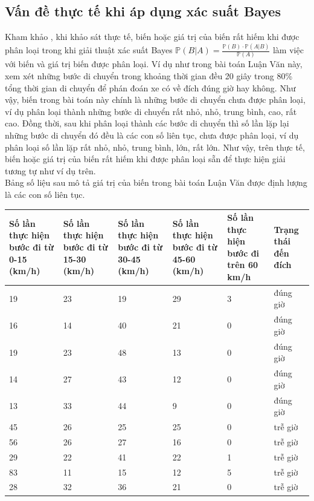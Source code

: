 \documentclass[a4paper, 13pt]{report}
\begin{document}
\subsection*{Vấn đề thực tế khi áp dụng xác suất Bayes}
Kham khảo \cite{2WAYSOFNB}, khi khảo sát thực tế, biến hoặc giá trị của biến rất hiếm khi được phân loại trong khi giải thuật xác suất Bayes $\mathbb{P}(B|A) = \frac{\mathbb{P}(B) \cdot \mathbb{P}(A|B)}{\mathbb{P}(A)}$ làm việc với biến và giá trị biến được phân loại. Ví dụ như trong bài toán Luận Văn này, xem xét những bước di chuyển trong khoảng thời gian đều 20 giây trong 80\% tổng thời gian di chuyển để phán đoán xe có về đích đúng giờ hay không. Như vậy, biến trong bài toán này chính là những bước di chuyển chưa được phân loại, ví dụ phân loại thành những bước di chuyển rất nhỏ, nhỏ, trung bình, cao, rất cao. Đồng thời, sau khi phân loại thành các bước di chuyển thì số lần lặp lại những bước di chuyển đó đều là các con số liên tục, chưa được phân loại, ví dụ phân loại số lần lặp rất nhỏ, nhỏ, trung bình, lớn, rất lớn. Như vậy, trên thực tế, biến hoặc giá trị của biến rất hiếm khi được phân loại sẵn để thực hiện giải tương tự như ví dụ trên.\\
Bảng số liệu sau mô tả giá trị của biến trong bài toán Luận Văn được định lượng là các con số liên tục.
\begin{flushleft}
\begin{tabular}{|p{2.6cm}|p{2.6cm}|p{2.6cm}|p{2.6cm}|p{2.6cm}|p{1.5cm}|}
\hline
Số lần thực hiện bước đi từ 0-15 (km/h)& Số lần thực hiện bước đi từ 15-30 (km/h) & Số lần thực hiện bước đi từ 30-45 (km/h) & Số lần thực hiện bước đi từ 45-60 (km/h) & Số lần thực hiện bước đi trên 60 km/h & Trạng thái đến đích \\ 
\hline
19 & 23 & 19 & 29 & 3 & đúng giờ\\
\hline
16 & 14 & 40 & 21 & 0 & đúng giờ\\
\hline
19 & 23 & 48 & 13 & 0 & đúng giờ\\
\hline
14 & 27 & 43 & 12 & 0 & đúng giờ\\
\hline
13 & 33 & 44 & 9 & 0 & đúng giờ \\
\hline
45 & 26 & 25 & 25 & 0 & trễ giờ\\
\hline
56 & 26 & 27 & 16 & 0 & trễ giờ\\
\hline
29 & 22 & 41 & 22 & 1 & trễ giờ\\
\hline
83 & 11 & 15 & 12 & 5 & trễ giờ\\
\hline
28 & 32 & 36 & 21 & 0 & trễ giờ\\
\hline
\end{tabular}
\end{flushleft}
\end{document}
